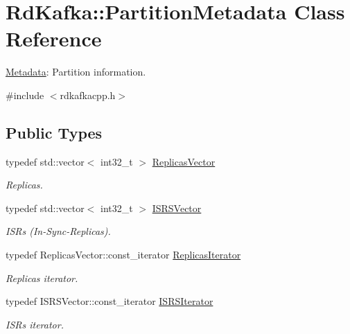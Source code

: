 \hypertarget{classRdKafka_1_1PartitionMetadata}{
\section{RdKafka::PartitionMetadata Class Reference}
\label{classRdKafka_1_1PartitionMetadata}
}


\hyperlink{classRdKafka_1_1Metadata}{Metadata}: Partition information.  


{\ttfamily \#include $<$rdkafkacpp.h$>$}\subsection*{Public Types}
\begin{DoxyCompactItemize}
\item 
\hypertarget{classRdKafka_1_1PartitionMetadata_aecb5ee6375494d28a1bef9fac049f147}{
typedef std::vector$<$ int32\_\-t $>$ \hyperlink{classRdKafka_1_1PartitionMetadata_aecb5ee6375494d28a1bef9fac049f147}{ReplicasVector}}
\label{classRdKafka_1_1PartitionMetadata_aecb5ee6375494d28a1bef9fac049f147}

\begin{DoxyCompactList}\small\item\em Replicas. \item\end{DoxyCompactList}\item 
\hypertarget{classRdKafka_1_1PartitionMetadata_a0683f0879c9c4474eddd271bda865065}{
typedef std::vector$<$ int32\_\-t $>$ \hyperlink{classRdKafka_1_1PartitionMetadata_a0683f0879c9c4474eddd271bda865065}{ISRSVector}}
\label{classRdKafka_1_1PartitionMetadata_a0683f0879c9c4474eddd271bda865065}

\begin{DoxyCompactList}\small\item\em ISRs (In-\/Sync-\/Replicas). \item\end{DoxyCompactList}\item 
\hypertarget{classRdKafka_1_1PartitionMetadata_a8b21e2f83d21e44139640ccbd01040db}{
typedef ReplicasVector::const\_\-iterator \hyperlink{classRdKafka_1_1PartitionMetadata_a8b21e2f83d21e44139640ccbd01040db}{ReplicasIterator}}
\label{classRdKafka_1_1PartitionMetadata_a8b21e2f83d21e44139640ccbd01040db}

\begin{DoxyCompactList}\small\item\em Replicas iterator. \item\end{DoxyCompactList}\item 
\hypertarget{classRdKafka_1_1PartitionMetadata_a6ce31da0cebc55cdb9ca61a752046d7b}{
typedef ISRSVector::const\_\-iterator \hyperlink{classRdKafka_1_1PartitionMetadata_a6ce31da0cebc55cdb9ca61a752046d7b}{ISRSIterator}}
\label{classRdKafka_1_1PartitionMetadata_a6ce31da0cebc55cdb9ca61a752046d7b}

\begin{DoxyCompactList}\small\item\em ISRs iterator. \item\end{DoxyCompactList}\end{DoxyCompactItemize}
